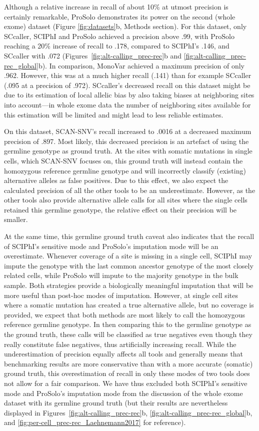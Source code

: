 \documentclass[12pt,inline]{wlscirep}
\begin{document}
Although a relative increase in recall of about 10\% at utmost precision is certainly remarkable, ProSolo demonstrates its power on the second (whole exome) dataset (Figure \ref{fig:datasets}b, Methods section).
For this dataset, only SCcaller, SCIPhI and ProSolo achieved a precision above .99, with ProSolo reaching a 20\% increase of recall to .178, compared to SCIPhI's .146, and SCcaller with .072 (Figures~\ref{fig:alt-calling_prec-rec}b and \ref{fig:alt-calling_prec-rec_global}b).
In comparison, MonoVar achieved a maximum precision of only .962. However, this was at a much higher recall (.141) than for example SCcaller (.095 at a precision of .972).
SCcaller's decreased recall on this dataset might be due to its estimation of local allelic bias by also taking biases at neighboring sites into account---in whole exome data the number of neighboring sites available for this estimation will be limited and might lead to less reliable estimates.

On this dataset, SCAN-SNV's recall increased to .0016 at a decreased maximum precision of .897.
Most likely, this decreased precision is an artefact of using the germline genotype as ground truth.
At the sites with somatic mutations in single cells, which SCAN-SNV focuses on, this ground truth will instead contain the homozygous reference germline genotype and will incorrectly classify (existing) alternative alleles as false positives.
Due to this effect, we also expect the calculated precision of all the other tools to be an underestimate.
However, as the other tools also provide alternative allele calls for all sites where the single cells retained this germline genotype, the relative effect on their precision will be smaller.

At the same time, this germline ground truth caveat also indicates that the recall of SCIPhI's sensitive mode and ProSolo's imputation mode will be an overestimate.
Whenever coverage of a site is missing in a single cell, SCIPhI may impute the genotype with the last common ancestor genotype of the most closely related cells, while ProSolo will impute to the majority genotype in the bulk sample.
Both strategies provide a biologically meaningful imputation that will be more useful than post-hoc modes of imputation.
However, at single cell sites where a somatic mutation has created a true alternative allele, but no coverage is provided, we expect that both methods are most likely to call the homozygous reference germline genotype.
In then comparing this to the germline genotype as the ground truth, these calls will be classified as true negatives even though they really constitute false negatives, thus artificially increasing recall.
While the underestimation of precision equally affects all tools and generally means that benchmarking results are more conservative than with a more accurate (somatic) ground truth, this overestimation of recall in only these modes of two tools does not allow for a fair comparison.
We have thus excluded both SCIPhI's sensitive mode and ProSolo's imputation mode from the discussion of the whole exome dataset with its germline ground truth (but their results are nevertheless displayed in Figures~\ref{fig:alt-calling_prec-rec}b, \ref{fig:alt-calling_prec-rec_global}b, and \ref{fig:per-cell_prec-rec_Laehnemann2017} for reference).
\end{document}
